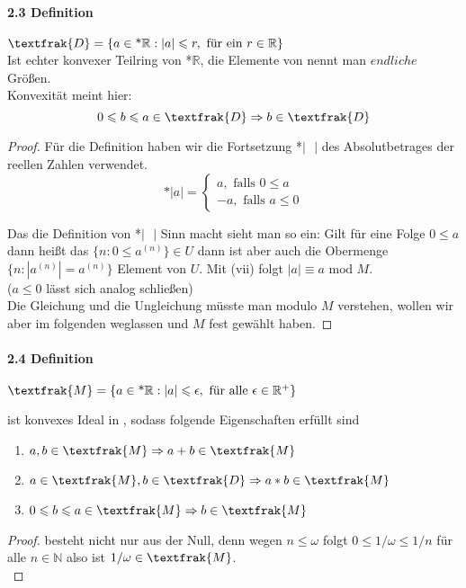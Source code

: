 \documentclass[a4paper]{article}
\begin{document}
\paragraph{2.3 Definition} $ \textfrak{D} = \{a \in \text{*}\mathbb{R}: |a| \leqslant r, \text{ für ein } r \in \mathbb{R}\} $ \\
Ist echter konvexer Teilring von *$\mathbb{R}$, die Elemente von  nennt man $ endliche $ Größen. \\
Konvexität meint hier:
$$ 0 \leqslant b \leqslant a \in \textfrak{D} \Rightarrow b \in \textfrak{D} $$
\begin{proof}
      Für die Definition haben wir die Fortsetzung *$| \text{ }|$ des Absolutbetrages der reellen Zahlen verwendet. 
      $$
      \text{*}|a| = 
            \begin{cases} 
                  a, \text{ falls } 0 \leqslant a \\
                  -a, \text{ falls } a \leqslant 0
            \end{cases} 
      $$

      \smallskip
      Das die Definition von *$|\text{ }|$ Sinn macht sieht man so ein: Gilt für eine Folge $ 0 \leqslant a $ 
      dann heißt das $ \{n: 0 \leqslant a^{(n)}\} \in U $ dann ist 
      aber auch die Obermenge $ \{n: |a^{(n)}| = a^{(n)}\} $ Element von $ U $. Mit (vii) folgt
      $ |a| \equiv a \text{ mod } M $. \\
      ($a \leqslant 0 $ lässt sich analog schließen) \\

      \smallskip
      Die Gleichung und die Ungleichung müsste man modulo $ M $ verstehen, wollen wir aber im folgenden weglassen und 
      $ M $ fest gewählt haben.

\end{proof}


\paragraph{2.4 Definition} $ \textfrak{M} = \{a \in \text{*}\mathbb{R}: |a| \leqslant \epsilon, \text{ für alle } \epsilon \in \mathbb{R}^+ \} $

\bigskip
{} ist konvexes Ideal in , sodass folgende Eigenschaften erfüllt sind 
\begin{enumerate}
      \item $a,b \in \textfrak{M} \Rightarrow a + b \in \textfrak{M} $ 
      \item $a \in \textfrak{M}, b \in \textfrak{D} \Rightarrow a * b \in \textfrak{M} $ 
      \item $0 \leqslant b \leqslant a \in \textfrak{M} \Rightarrow b \in \textfrak{M} $ 
\end{enumerate}
\begin{proof}
       besteht nicht nur aus der Null, denn wegen $ n \leqslant \omega $ folgt
      $ 0 \leqslant 1/\omega \leqslant 1/n $ für alle $ n \in \mathbb{N} $ also ist $ 1/\omega \in \textfrak{M} $. \\

      \end{proof}
\end{document}
